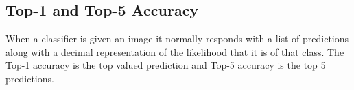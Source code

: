 
		




\tocless\subsection{Top-1 and Top-5 Accuracy}
When a classifier is given an image it normally responds with a list of
predictions along with a decimal representation of the likelihood that it is of
that class. The Top-1 accuracy is the top valued prediction and Top-5 accuracy
is the top 5 predictions.

